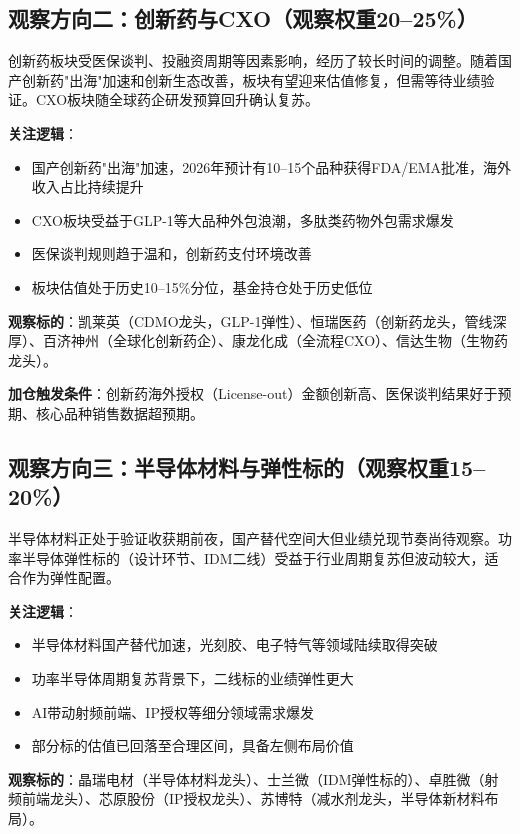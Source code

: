 \subsection{观察方向二：创新药与CXO（观察权重20--25\%）}

创新药板块受医保谈判、投融资周期等因素影响，经历了较长时间的调整。随着国产创新药"出海"加速和创新生态改善，板块有望迎来估值修复，但需等待业绩验证。CXO板块随全球药企研发预算回升确认复苏。

\textbf{关注逻辑}：
\vspace{0.2em}
\begin{itemize}[leftmargin=2em]
\item 国产创新药"出海"加速，2026年预计有10--15个品种获得FDA/EMA批准，海外收入占比持续提升
\item CXO板块受益于GLP-1等大品种外包浪潮，多肽类药物外包需求爆发
\item 医保谈判规则趋于温和，创新药支付环境改善
\item 板块估值处于历史10--15\%分位，基金持仓处于历史低位
\end{itemize}

\textbf{观察标的}：凯莱英（CDMO龙头，GLP-1弹性）、恒瑞医药（创新药龙头，管线深厚）、百济神州（全球化创新药企）、康龙化成（全流程CXO）、信达生物（生物药龙头）。

\textbf{加仓触发条件}：创新药海外授权（License-out）金额创新高、医保谈判结果好于预期、核心品种销售数据超预期。

\subsection{观察方向三：半导体材料与弹性标的（观察权重15--20\%）}

半导体材料正处于验证收获期前夜，国产替代空间大但业绩兑现节奏尚待观察。功率半导体弹性标的（设计环节、IDM二线）受益于行业周期复苏但波动较大，适合作为弹性配置。

\textbf{关注逻辑}：
\vspace{0.2em}
\begin{itemize}[leftmargin=2em]
\item 半导体材料国产替代加速，光刻胶、电子特气等领域陆续取得突破
\item 功率半导体周期复苏背景下，二线标的业绩弹性更大
\item AI带动射频前端、IP授权等细分领域需求爆发
\item 部分标的估值已回落至合理区间，具备左侧布局价值
\end{itemize}

\textbf{观察标的}：晶瑞电材（半导体材料龙头）、士兰微（IDM弹性标的）、卓胜微（射频前端龙头）、芯原股份（IP授权龙头）、苏博特（减水剂龙头，半导体新材料布局）。

